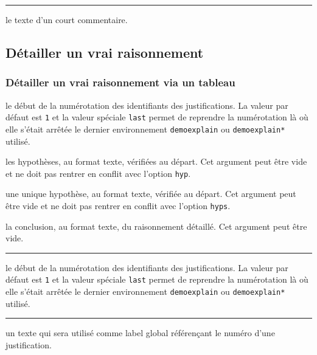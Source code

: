 \documentclass[12pt,a4paper]{book}
\newcommand\env[1]{\texttt{#1}}
\theoremstyle{definition}
\newcommand\separation{
	\medskip
	\hfill\rule{0.5\textwidth}{0.75pt}\hfill
	\medskip
}
\begin{document}
{{\separation



\IDarg{} le texte d'un court commentaire.








\subsection{Détailler un \og vrai \fg{} raisonnement}



\subsubsection{Détailler un \og vrai \fg{} raisonnement via un tableau}


 le début de la numérotation des identifiants des justifications.
              La valeur par défaut est \verb+1+ et la valeur spéciale \verb+last+ permet de reprendre la numérotation là où elle s'était arrêtée le dernier environnement \env{demoexplain} ou \env{demoexplain*} utilisé.

 les hypothèses, au format texte, vérifiées au départ.
              Cet argument peut être vide et ne doit pas rentrer en conflit avec l'option \verb+hyp+.

 une unique hypothèse, au format texte, vérifiée au départ.
              Cet argument peut être vide et ne doit pas rentrer en conflit avec l'option \verb+hyps+.

 la conclusion, au format texte, du raisonnement détaillé.
              Cet argument peut être vide.


\separation



 le début de la numérotation des identifiants des justifications.
              La valeur par défaut est \verb+1+ et la valeur spéciale \verb+last+ permet de reprendre la numérotation là où elle s'était arrêtée le dernier environnement \env{demoexplain} ou \env{demoexplain*} utilisé.


\separation



\IDoption{} un texte qui sera utilisé comme label global référençant le numéro d'une justification.


}}
\end{document}
